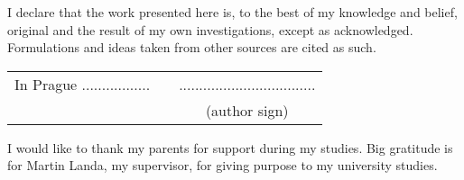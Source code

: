 \newcommand{\odsaditodzhora}{\hskip1pt\vfill}

\odsaditodzhora
{}

 \baselineskip

I declare that the work presented here is, to the best of my knowledge and
belief, original and the result of my own investigations, except as acknowledged.
Formulations and ideas taken from other sources are cited as such.

\begin{flushleft}
\begin{tabular}{cp{}c}
In Prague .................
& 
&
..................................
\\
&&
(author sign)
\end{tabular}

\end{flushleft}
\newpage

\odsaditodzhora
{}

 \baselineskip

I would like to thank my parents for support during my studies. 
Big gratitude is for Martin Landa, my supervisor, for giving purpose to my university studies. 
\newpage
